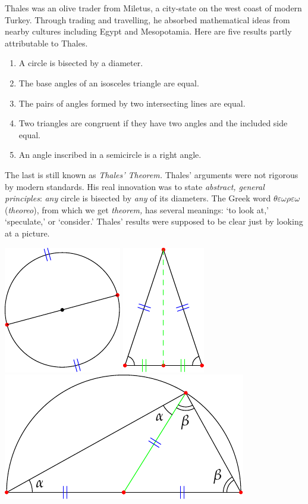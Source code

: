 Thales was an olive trader from Miletus, a city-state on the west coast of modern Turkey. Through trading and travelling, he absorbed mathematical ideas from nearby cultures including Egypt and Mesopotamia. Here are five results partly attributable to Thales.
\begin{enumerate}\itemsep0pt
  \item A circle is bisected by a diameter.
  \item The base angles of an isosceles triangle are equal.
  \item The pairs of angles formed by two intersecting lines are equal.
  \item Two triangles are congruent if they have two angles and the included side equal.
  \item An angle inscribed in a semicircle is a right angle.
\end{enumerate}
The last is still known as \emph{Thales' Theorem.} Thales' arguments were not rigorous by modern standards. His real innovation was to state \emph{abstract, general principles}: \emph{any} circle is bisected by \emph{any} of its diameters. The Greek word $\theta\varepsilon\omega\rho\varepsilon\omega$ (\emph{theoreo}), from which we get \emph{theorem,} has several meanings: `to look at,' `speculate,' or `consider.' Thales' results were supposed to be clear just by looking at a picture.
\begin{center}
\includegraphics[scale=0.9]{thales-1}
\qquad\qquad
\includegraphics[scale=0.9]{thales-2}
\qquad\qquad
\includegraphics[scale=0.9]{thales-5}\label{thm:thales}
\end{center}
